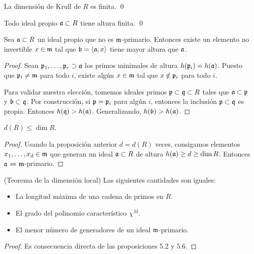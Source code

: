 \begin{corollary}
La dimensión de Krull de $R$ es finita. \qed
\end{corollary}

\begin{corollary}
Todo ideal propio $\mathfrak a \subset R$ tiene altura finita. \qed
\end{corollary}

\begin{proposition}
Sea $\mathfrak a \subset R$ un ideal propio que no es $\mathfrak m$-primario. Entonces existe un elemento no invertible $x \in \mathfrak m$ tal que $\mathfrak b = \langle \mathfrak a, x \rangle$ tiene mayor altura que $\mathfrak a$.
\end{proposition}

\begin{proof}
Sean $\mathfrak p_1, \dots, \mathfrak p_r \supset \mathfrak a$ los primos minimales de altura $h(\mathfrak p_i) = h(\mathfrak a)$. Puesto que $\mathfrak p_i \ne \mathfrak m$ para todo $i$, existe algún $x \in \mathfrak m$ tal que $x \notin \mathfrak p_i$ para todo $i$.

Para validar nuestra elección, tomemos ideales primos $\mathfrak p \subset \mathfrak q \subset R$ tales que $\mathfrak a \subset \mathfrak p$ y $\mathfrak b \subset \mathfrak q$. Por construcción, si $\mathfrak p = \mathfrak p_i$ para algún $i$, entonces la inclusión $\mathfrak p \subset \mathfrak q$ es propia. Entonces $h(\mathfrak q) > h(\mathfrak a)$. Generalizando, $h(\mathfrak b) > h(\mathfrak a)$.
\end{proof}

\begin{proposition}
$d(R) \le \dim R$.
\end{proposition}

\begin{proof}
Usando la proposición anterior $d = d(R)$ veces, consigamos elementos $x_1, \dots, x_d \in \mathfrak m$ que generan un ideal $\mathfrak a \subset R$ de altura $h(\mathfrak a) \ge d \ge \dim R$. Entonces $\mathfrak a$ es $\mathfrak m$-primario.
\end{proof}

\begin{theorem}
(Teorema de la dimensión local) Las siguientes cantidades son iguales:

\begin{itemize}
    \item La longitud máxima de una cadena de primos en $R$.
    \item El grado del polinomio característico $\chi^M$.
    \item El menor número de generadores de un ideal $\mathfrak m$-primario.
\end{itemize}
\end{theorem}

\begin{proof}
Es consecuencia directa de las proposiciones 5.2 y 5.6.
\end{proof}
